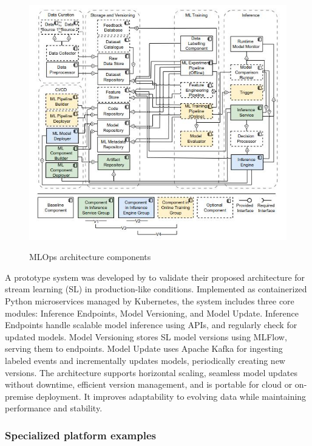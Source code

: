 \begin{figure}[!htbp]
    \caption{MLOps architecture components\cite{Amou_Najafabadi_2024}}
    \centering
    \includegraphics[scale=0.5]{images/archi-components}
    \label{fig:archi}
\end{figure}

A prototype system was developed by\cite{RODRIGUES2025104169} to validate their proposed architecture for stream learning (SL) in production-like conditions.
Implemented as containerized Python microservices managed by Kubernetes, the system includes three core modules: Inference Endpoints, Model Versioning, and Model Update.
Inference Endpoints handle scalable model inference using APIs, and regularly check for updated models.
Model Versioning stores SL model versions using MLFlow, serving them to endpoints.
Model Update uses Apache Kafka for ingesting labeled events and incrementally updates models, periodically creating new versions.
The architecture supports horizontal scaling, seamless model updates without downtime, efficient version management,
and is portable for cloud or on-premise deployment.
It improves adaptability to evolving data while maintaining performance and stability.

\subsubsection{Specialized platform examples}

